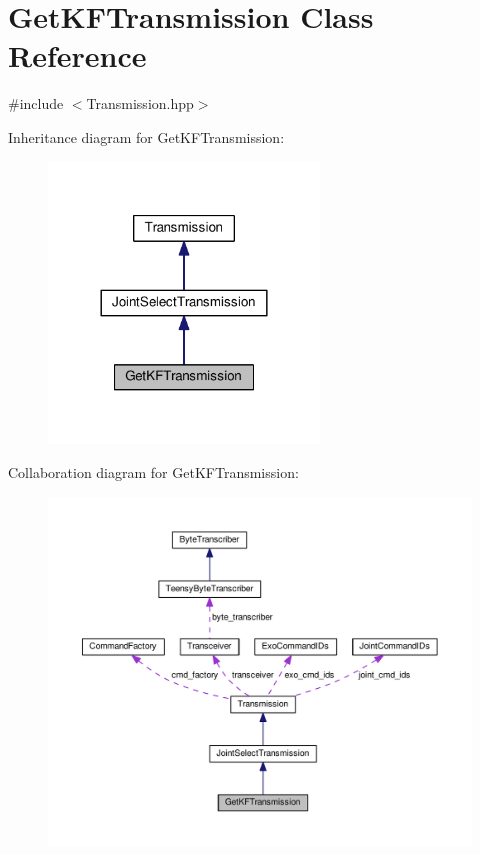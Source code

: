 \hypertarget{classGetKFTransmission}{}\section{Get\+K\+F\+Transmission Class Reference}
\label{classGetKFTransmission}


{\ttfamily \#include $<$Transmission.\+hpp$>$}



Inheritance diagram for Get\+K\+F\+Transmission\+:\nopagebreak
\begin{figure}[H]
\begin{center}
\leavevmode
\includegraphics[width=204pt]{classGetKFTransmission__inherit__graph}
\end{center}
\end{figure}


Collaboration diagram for Get\+K\+F\+Transmission\+:
\nopagebreak
\begin{figure}[H]
\begin{center}
\leavevmode
\includegraphics[width=350pt]{classGetKFTransmission__coll__graph}
\end{center}
\end{figure}
